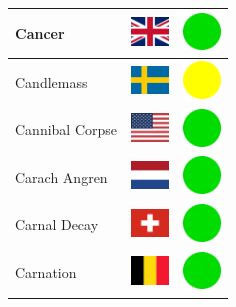 \documentclass[12pt, a4paper, twoside]{report}
\begin{document}
\begin{center}
\begin{longtable}{|p{5cm}|p{2cm}|p{2cm}|}
Cancer & \includegraphics[width=1cm]{4x3/gb} & \includegraphics[width=1cm]{likes/y} \\ \hline
Candlemass & \includegraphics[width=1cm]{4x3/se} & \includegraphics[width=1cm]{likes/m} \\ \hline
Cannibal Corpse & \includegraphics[width=1cm]{4x3/us} & \includegraphics[width=1cm]{likes/y} \\ \hline
Carach Angren & \includegraphics[width=1cm]{4x3/nl} & \includegraphics[width=1cm]{likes/y} \\ \hline
Carnal Decay & \includegraphics[width=1cm]{4x3/ch} & \includegraphics[width=1cm]{likes/y} \\ \hline
Carnation & \includegraphics[width=1cm]{4x3/be} & \includegraphics[width=1cm]{likes/y} \\ \hline

\end{longtable}
\end{center}
\end{document}
